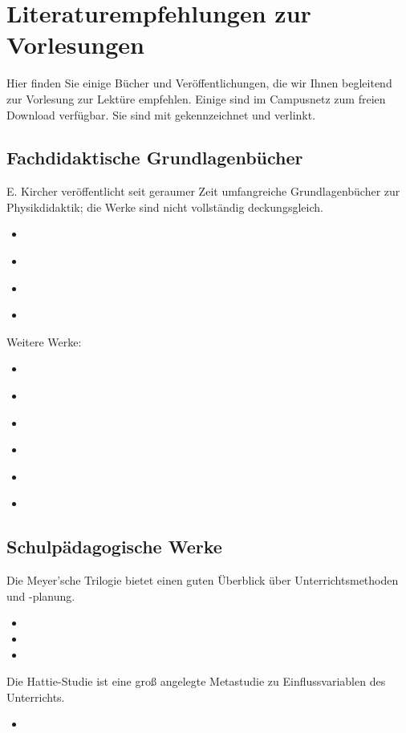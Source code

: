 \chapter{Literaturempfehlungen zur Vorlesungen}
Hier finden Sie einige Bücher und Veröffentlichungen, die wir Ihnen begleitend zur Vorlesung zur Lektüre empfehlen. Einige sind im Campusnetz zum freien Download verfügbar. Sie sind mit \faFilePdf[refular] gekennzeichnet und verlinkt.

\section{Fachdidaktische Grundlagenbücher}
E. Kircher veröffentlicht seit geraumer Zeit umfangreiche Grundlagenbücher zur Physikdidaktik; die Werke sind nicht vollständig deckungsgleich.
\begin{itemize}
	\item {} \href{https://link.springer.com/book/10.1007/978-3-662-59490-2}{\faFilePdf[regular]}
	\item {} \href{https://link.springer.com/book/10.1007/978-3-662-59496-4}{\faFilePdf[regular]}
	\item {} \href{https://link.springer.com/book/10.1007/978-3-642-01602-8}{\faFilePdf[regular]}
	\item {} \href{https://link.springer.com/book/10.1007/978-3-642-56386-7}{\faFilePdf[regular]}
\end{itemize}

Weitere Werke:
\begin{itemize}
	\item {}
	\item {} \href{https://link.springer.com/book/10.1007/978-3-662-57270-2}{\faFilePdf[regular]}
	\item {} \href{https://link.springer.com/book/10.1007/978-3-662-63053-2}{\faFilePdf[regular]}
	\item {}
	\item {} \href{https://www.degruyter.com/document/doi/10.1524/9783486721249/html}{\faFilePdf[regular]} 
	\item {}
\end{itemize}

\section{Schulpädagogische Werke}
Die Meyer'sche Trilogie bietet einen guten Überblick über Unterrichtsmethoden und -planung.
\begin{itemize}
	\item {}
	\item {}
	\item {}
\end{itemize}
Die Hattie-Studie ist eine groß angelegte Metastudie zu Einflussvariablen des Unterrichts.
\begin{itemize}
	\item {}
\end{itemize}

